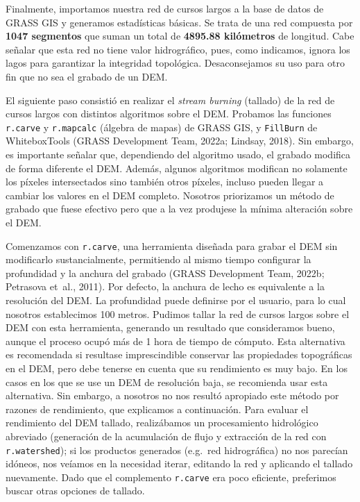 \documentclass[spanish]{article}
\begin{document}
Finalmente, importamos nuestra red de cursos largos a la base de datos
de GRASS GIS y generamos estadísticas básicas. Se trata de una red
compuesta por \textbf{1047 segmentos} que suman un total de
\textbf{4895.88 kilómetros} de longitud. Cabe señalar que esta red no
tiene valor hidrográfico, pues, como indicamos, ignora los lagos para
garantizar la integridad topológica. Desaconsejamos su uso para otro fin
que no sea el grabado de un DEM.

El siguiente paso consistió en realizar el \emph{stream burning}
(tallado) de la red de cursos largos con distintos algoritmos sobre el
DEM. Probamos las funciones \texttt{r.carve} y \texttt{r.mapcalc}
(álgebra de mapas) de GRASS GIS, y \texttt{FillBurn} de WhiteboxTools
(GRASS Development Team, 2022a; Lindsay, 2018). Sin embargo, es
importante señalar que, dependiendo del algoritmo usado, el grabado
modifica de forma diferente el DEM. Además, algunos algoritmos modifican
no solamente los píxeles intersectados sino también otros píxeles,
incluso pueden llegar a cambiar los valores en el DEM completo. Nosotros
priorizamos un método de grabado que fuese efectivo pero que a la vez
produjese la mínima alteración sobre el DEM.

Comenzamos con \texttt{r.carve}, una herramienta diseñada para grabar el
DEM sin modificarlo sustancialmente, permitiendo al mismo tiempo
configurar la profundidad y la anchura del grabado (GRASS Development
Team, 2022b; Petrasova et~al., 2011). Por defecto, la anchura de lecho
es equivalente a la resolución del DEM. La profundidad puede definirse
por el usuario, para lo cual nosotros establecimos 100 metros. Pudimos
tallar la red de cursos largos sobre el DEM con esta herramienta,
generando un resultado que consideramos bueno, aunque el proceso ocupó
más de 1 hora de tiempo de cómputo. Esta alternativa es recomendada si
resultase imprescindible conservar las propiedades topográficas en el
DEM, pero debe tenerse en cuenta que su rendimiento es muy bajo. En los
casos en los que se use un DEM de resolución baja, se recomienda usar
esta alternativa. Sin embargo, a nosotros no nos resultó apropiado este
método por razones de rendimiento, que explicamos a continuación. Para
evaluar el rendimiento del DEM tallado, realizábamos un procesamiento
hidrológico abreviado (generación de la acumulación de flujo y
extracción de la red con \texttt{r.watershed}); si los productos
generados (e.g.~red hidrográfica) no nos parecían idóneos, nos veíamos
en la necesidad iterar, editando la red y aplicando el tallado
nuevamente. Dado que el complemento \texttt{r.carve} era poco eficiente,
preferimos buscar otras opciones de tallado.
\end{document}
